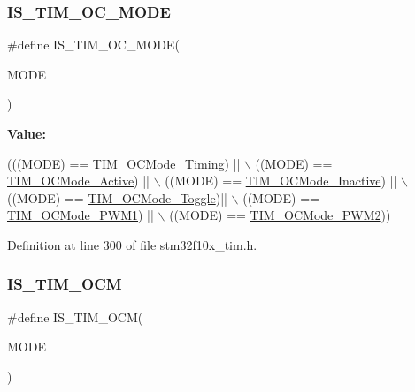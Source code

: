 \subsubsection{\texorpdfstring{I\+S\+\_\+\+T\+I\+M\+\_\+\+O\+C\+\_\+\+M\+O\+DE}{IS\_TIM\_OC\_MODE}}
{\footnotesize\ttfamily \#define I\+S\+\_\+\+T\+I\+M\+\_\+\+O\+C\+\_\+\+M\+O\+DE(\begin{DoxyParamCaption}\item[{}]{M\+O\+DE }\end{DoxyParamCaption})}

{\bfseries Value\+:}
\begin{DoxyCode}
(((MODE) == \hyperlink{group___t_i_m___output___compare__and___p_w_m__modes_ga54d5745fade3b2f8ea1325e7447ca760}{TIM\_OCMode\_Timing}) || \(\backslash\)
                              ((MODE) == \hyperlink{group___t_i_m___output___compare__and___p_w_m__modes_ga76bac57d41dc67218772f9c745c77102}{TIM\_OCMode\_Active}) || \(\backslash\)
                              ((MODE) == \hyperlink{group___t_i_m___output___compare__and___p_w_m__modes_gae0c350d7adaea14a37cabc2ab762695f}{TIM\_OCMode\_Inactive}) || \(\backslash\)
                              ((MODE) == \hyperlink{group___t_i_m___output___compare__and___p_w_m__modes_ga8b8adb6e81fe88bd14d44430f7f97021}{TIM\_OCMode\_Toggle})|| \(\backslash\)
                              ((MODE) == \hyperlink{group___t_i_m___output___compare__and___p_w_m__modes_gaefbe32dddc9630fbcc48b302b50d15fc}{TIM\_OCMode\_PWM1}) || \(\backslash\)
                              ((MODE) == \hyperlink{group___t_i_m___output___compare__and___p_w_m__modes_ga722d8f33a795ef82ed7ae76dfbb7613d}{TIM\_OCMode\_PWM2}))
\end{DoxyCode}


Definition at line 300 of file stm32f10x\+\_\+tim.\+h.

\mbox{\label{group___t_i_m___output___compare__and___p_w_m__modes_ga45f530dd241d3b0787b5c2d62cd1b98f}} 
\subsubsection{\texorpdfstring{I\+S\+\_\+\+T\+I\+M\+\_\+\+O\+CM}{IS\_TIM\_OCM}}
{\footnotesize\ttfamily \#define I\+S\+\_\+\+T\+I\+M\+\_\+\+O\+CM(\begin{DoxyParamCaption}\item[{}]{M\+O\+DE }\end{DoxyParamCaption})}

